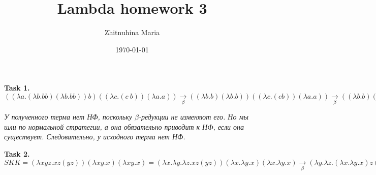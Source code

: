 \documentclass{article}
\title{Lambda homework 3}
\author{Zhitnuhina Maria}
\date{\today}
\begin{document}
\maketitle
 
\textbf{Task 1.} 
 $ ((\lambda a.(\lambda b.b b) (\lambda b.b b)) b) ((\lambda c.(c\:b)) (\lambda a.a))\xrightarrow[\beta]{}((\lambda b.b)(\lambda b.b))((\lambda c.(c b))(\lambda a.a))\xrightarrow[\beta]{}((\lambda b.b)(\lambda b.b))((\lambda a.a) b)\xrightarrow[\beta]{}(\lambda b.b)(\lambda b.b) b$

\textit{У полученного терма нет НФ, поскольку $\beta$-редукции не изменяют его. 
Но мы шли по нормальной стратегии, а она обязательно приводит к НФ, если она существует. Следовательно, у исходного терма нет НФ.}

\textbf{Task 2.}
$ S K K = (\lambda x y z.x z (y z)) (\lambda x y.x) (\lambda x y.x) 
= (\lambda x.\lambda y.\lambda z.x z (y z))(\lambda x.\lambda y.x) (\lambda x.\lambda y.x)
\xrightarrow[\beta]{} (\lambda y.\lambda z.(\lambda x.\lambda y.x) z (y z)) (\lambda x.\lambda y.x)
\xrightarrow[\beta]{} \lambda z.(\lambda x.\lambda y.x) z ((\lambda x.\lambda y.x) z)
\xrightarrow[\beta]{} \lambda z.(\lambda x.\lambda y.x) z \lambda y.z
\xrightarrow[\beta]{} \lambda z.(\lambda y.z) \lambda y.z
\xrightarrow[\beta]{} \lambda z.z = I
$
\end{document}

